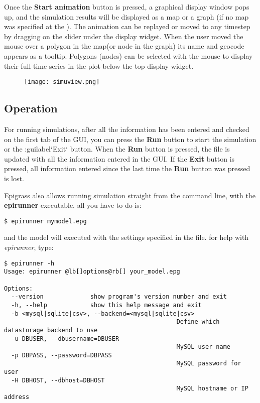 \documentclass[a4paper,10pt]{manual}
\begin{document}
Once the \textbf{Start animation} button is pressed, a graphical display window pops up, and the simulation results will be displayed as a map or a graph (if no map was specified at the ). The animation can be replayed or moved to any timestep by dragging on the slider under the display widget. When the user moved the mouse over a polygon in the map(or node in the graph) its name and geocode appears as a tooltip. Polygons (nodes) can be selected with the mouse to display their full time series in the plot below the top display widget.
\begin{figure}[htbp]
\centering

\texttt{[image: simuview.png]}
\end{figure}


\subsection{Operation}

For running simulations, after all the information has been entered and checked on the first tab of the GUI, you can press the \textbf{Run} button to start the simulation or the :guilabel`Exit` button. When the \textbf{Run} button is pressed, the  file is updated with all the information entered in the GUI. If the \textbf{Exit} button is pressed, all information entered since the last time the \textbf{Run} button was pressed is lost.

Epigrass also allows running simulation straight from the command line, with the \textbf{epirunner} executable. all you have to do is:

\begin{Verbatim}[commandchars=@\[\]]
$ epirunner mymodel.epg
\end{Verbatim}

and the model will executed with the settings specified in the  file. for help with \emph{epirunner}, type:

\begin{Verbatim}[commandchars=@\[\]]
$ epirunner -h
Usage: epirunner @lb[]options@rb[] your_model.epg

Options:
  --version             show program's version number and exit
  -h, --help            show this help message and exit
  -b <mysql|sqlite|csv>, --backend=<mysql|sqlite|csv>
                                                Define which datastorage backend to use
  -u DBUSER, --dbusername=DBUSER
                                                MySQL user name
  -p DBPASS, --password=DBPASS
                                                MySQL password for user
  -H DBHOST, --dbhost=DBHOST
                                                MySQL hostname or IP address
\end{Verbatim}
\end{document}
